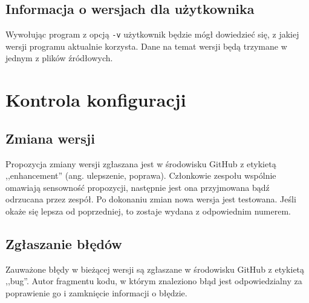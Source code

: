 \documentclass[a4paper]{article}
\begin{document}
\subsection{Informacja o wersjach dla użytkownika}

Wywołując program z opcją \verb+-v+ użytkownik będzie mógł dowiedzieć się, z jakiej wersji programu aktualnie korzysta. Dane na temat wersji będą trzymane w jednym z plików źródłowych. 

\section {Kontrola konfiguracji}

\subsection{Zmiana wersji}

Propozycja zmiany wersji zgłaszana jest w środowisku GitHub z etykietą ,,enhancement'' (ang. ulepszenie, poprawa). Członkowie zespołu wspólnie omawiają sensowność propozycji, następnie jest ona przyjmowana bądź odrzucana przez zespół. Po dokonaniu zmian nowa wersja jest testowana. Jeśli okaże się lepsza od poprzedniej, to zostaje wydana z odpowiednim numerem.

\subsection{Zgłaszanie błędów}

Zauważone błędy w bieżącej wersji są zgłaszane w środowisku GitHub z etykietą ,,bug''. Autor fragmentu kodu, w którym znaleziono błąd jest odpowiedzialny za poprawienie go i zamknięcie informacji o błędzie.
\end{document}
